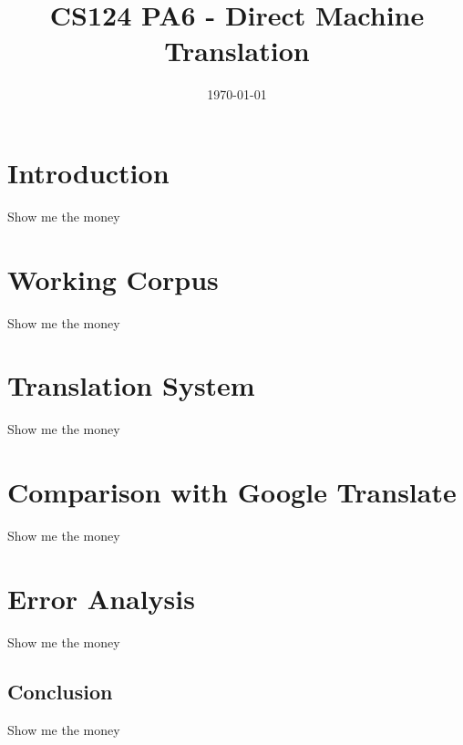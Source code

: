 \documentclass[11pt]{article} %
\begin{document}
\title{CS124 PA6 - Direct Machine Translation}
\date{\today}
\maketitle

\section{Introduction}
Show me the money

\section{Working Corpus}
Show me the money

\section{Translation System}
Show me the money

\section{Comparison with Google Translate}
Show me the money

\section{Error Analysis}
Show me the money

\subsection{Conclusion}
Show me the money
\end{document}
